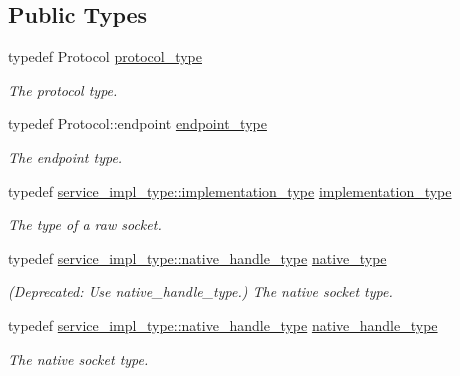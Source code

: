 \subsection*{Public Types}
\begin{DoxyCompactItemize}
\item 
typedef Protocol \hyperlink{classasio_1_1raw__socket__service_a7d559e265719280febe97fe07fbb524d}{protocol\+\_\+type}
\begin{DoxyCompactList}\small\item\em The protocol type. \end{DoxyCompactList}\item 
typedef Protocol\+::endpoint \hyperlink{classasio_1_1raw__socket__service_a8278f352f4e4424d431320f924e8b496}{endpoint\+\_\+type}
\begin{DoxyCompactList}\small\item\em The endpoint type. \end{DoxyCompactList}\item 
typedef \hyperlink{structasio_1_1detail_1_1reactive__socket__service_1_1implementation__type}{service\+\_\+impl\+\_\+type\+::implementation\+\_\+type} \hyperlink{classasio_1_1raw__socket__service_aa2e0ef73d6504fbcab510cb835e9e3d9}{implementation\+\_\+type}
\begin{DoxyCompactList}\small\item\em The type of a raw socket. \end{DoxyCompactList}\item 
typedef \hyperlink{classasio_1_1detail_1_1reactive__socket__service_a2fc869359f3eb7b6f25925f10e594e1d}{service\+\_\+impl\+\_\+type\+::native\+\_\+handle\+\_\+type} \hyperlink{classasio_1_1raw__socket__service_ac593d0ef0d19e36b2226e91476fd6566}{native\+\_\+type}
\begin{DoxyCompactList}\small\item\em (Deprecated\+: Use native\+\_\+handle\+\_\+type.) The native socket type. \end{DoxyCompactList}\item 
typedef \hyperlink{classasio_1_1detail_1_1reactive__socket__service_a2fc869359f3eb7b6f25925f10e594e1d}{service\+\_\+impl\+\_\+type\+::native\+\_\+handle\+\_\+type} \hyperlink{classasio_1_1raw__socket__service_a79802711654c4d649ff11b7fe238b927}{native\+\_\+handle\+\_\+type}
\begin{DoxyCompactList}\small\item\em The native socket type. \end{DoxyCompactList}\end{DoxyCompactItemize}

